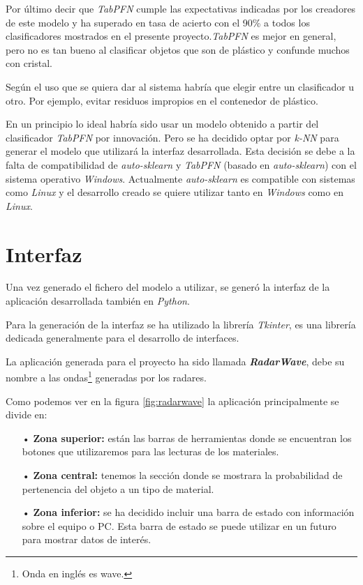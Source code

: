 Por último decir que \textit{TabPFN} cumple las expectativas indicadas por los creadores de este modelo y ha superado en tasa de acierto con el 90\% a todos los clasificadores mostrados en el presente proyecto.\textit{TabPFN} es mejor en general, pero no es tan bueno al clasificar objetos que son de plástico y confunde muchos con cristal.

Según el uso que se quiera dar al sistema habría que elegir entre un clasificador u otro. Por ejemplo, evitar residuos impropios en el contenedor de plástico.

En un principio lo ideal habría sido usar un modelo obtenido a partir del clasificador \textit{TabPFN} por innovación. Pero se ha decidido optar por \textit{k-NN} para generar el modelo que utilizará la interfaz desarrollada. Esta decisión se debe a la falta de compatibilidad de \textit{auto-sklearn} y \textit{TabPFN} (basado en \textit{auto-sklearn}) con el sistema operativo \textit{Windows}. Actualmente \textit{auto-sklearn} es compatible con sistemas como \textit{Linux} y el desarrollo creado se quiere utilizar tanto en \textit{Windows} como en \textit{Linux}.

\section{Interfaz}

Una vez generado el fichero del modelo a utilizar, se generó la interfaz de la aplicación desarrollada también en \textit{Python}.

Para la generación de la interfaz se ha utilizado la librería \textit{Tkinter}, es una librería dedicada generalmente para el desarrollo de interfaces.

La aplicación generada para el proyecto ha sido llamada \textit{\textbf{RadarWave}}, debe su nombre a las ondas\footnote{Onda en inglés es wave.} generadas por los radares.


Como podemos ver en la figura \ref{fig:radarwave} la aplicación principalmente se divide en:
\begin{itemize}
\item[•] \textbf{Zona superior:} están las barras de herramientas donde se encuentran los botones que utilizaremos para las lecturas de los materiales. 
\item[•] \textbf{Zona central:} tenemos la sección donde se mostrara la probabilidad de pertenencia del objeto a un tipo de material.
\item[•] \textbf{Zona inferior:} se ha decidido incluir una barra de estado con información sobre el equipo o PC. Esta barra de estado se puede utilizar en un futuro para mostrar datos de interés.
\end{itemize}


